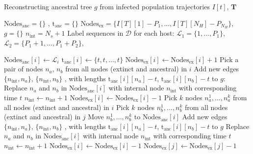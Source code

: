 \documentclass[a4paper,18pt]{report}
\begin{document}
\begin{algorithm}
\caption{Reconstructing ancestral tree $g$ from infected population trajectories $I[t]$, $\mathbf{T}$ \label{alg:g_from_I}}
\begin{algorithmic}
\STATE ${\textrm{Nodes}_{\textrm{anc}}=\{\}}$ , ${\textrm{t}_{\textrm{anc}}=\{\}}$ 
\STATE ${\textrm{Nodes}_{\textrm{ex}}}=\{I[T][1] - P_1, ..., I[T][N_H] - P_{N_H}\}$,   
\STATE $g=\{\}$ 
\STATE $n_{\textrm{int}}= N_s + 1$ 
\STATE Label sequences in $\mathcal{D}$ for each host: $\mathcal{L}_1=\{1,...,P_1\}$,  $\mathcal{L}_2=\{P_1+1,...,P_1 + P_2\}$, 
{
{
	\STATE $\textrm{Nodes}_{\textrm{anc}}[i] \gets \mathcal{L}_i $
	\STATE $\textrm{t}_{\textrm{anc}}[i] \gets \{t, t, ..., t\}$
}
\ENDIF
{}	
	\STATE $\textrm{Nodes}_{\textrm{ex}}[i] \gets \textrm{Nodes}_{\textrm{ex}}[i]  + 1 $
\ENDIF
{}	
{
	\STATE Pick a pair of nodes $n_a$, $n_b$ from all nodes (extinct and ancestral) in $i$
	{
		\STATE  Add new edges $\{n_{\textrm{int}}, n_a \}$, $\{n_{\textrm{int}}, n_b \}$ , with lengths $\textrm{t}_{\textrm{anc}}[i][n_a] - t$, $\textrm{t}_{\textrm{anc}}[i][n_b] - t$ to $g$:
		\STATE Replace $n_a$ and $n_b$ in $\textrm{Nodes}_{\textrm{anc}}[i]$ with internal node $n_{\textrm{int}}$ with corresponding time $t$
		\STATE $n_{\textrm{int}} \gets n_{\textrm{int}} + 1$
	}
	\ELSE
	{
		\STATE $\textrm{Nodes}_{\textrm{ex}}[i] \gets \textrm{Nodes}_{\textrm{ex}}[i]  - 1 $
	}
	\ENDIF
}
\ENDIF
{}	
{
	\STATE Pick $k$ nodes $n_a^1,...,n_a^k$ from all nodes (extinct and ancestral) in $i$
	\STATE Pick $k$ nodes $n_b^1,...,n_b^k$ from all nodes (extinct and ancestral) in $j$
	\STATE Move  $n_b^1,...,n_b^k$ to $\textrm{Nodes}_{\textrm{anc}}[i]$ 
	{
	{
		\STATE  Add new edges $\{n_{\textrm{int}}, n_a \}$, $\{n_{\textrm{int}}, n_b \}$ , with lengths $\textrm{t}_{\textrm{anc}}[i][n_a] - t$, $\textrm{t}_{\textrm{anc}}[i][n_b] - t$ to $g$
		\STATE Replace $n_a$ and $n_b$ in $\textrm{Nodes}_{\textrm{anc}}[i]$ with internal node $n_{\textrm{int}}$ with corresponding time $t$
		\STATE $n_{\textrm{int}} \gets n_{\textrm{int}} + 1$
	}
	\ELSE
	{
		{
		\STATE $\textrm{Nodes}_{\textrm{ex}}[i] \gets \textrm{Nodes}_{\textrm{ex}}[i]  - 1 $
		}
		\ELSE
		{
		\STATE $\textrm{Nodes}_{\textrm{ex}}[j] \gets \textrm{Nodes}_{\textrm{ex}}[j]  - 1 $
		}
		\ENDIF
	}
	\ENDIF
	}
	\ENDFOR
}
\ENDIF

}
\ENDFOR
\end{algorithmic}
\end{algorithm}
\end{document}
